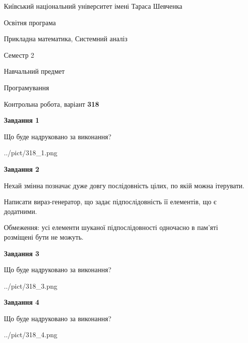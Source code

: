 \documentclass[12pt, ukrainian]{article}
\begin{document}
{{\begin {small}\par
{ \center  Київський національний університет імені Тараса Шевченка \par}
{\parbox {5 cm}{Освітня програма \hfill}{\parbox {8 cm}{Прикладна математика, Системний аналіз \hfill}}\parbox {5 cm}{\hfill Семестр 2}}\par
{\parbox {5 cm} {Навчальний предмет \hfill}\parbox {7 cm}{Програмування \hfill}\parbox {6cm}{\hfill}\par}\vspace{-7pt} \end{small}}{\center Контрольна робота, варіант  \No \textbf
{ 318 }\par}}
{
\begin {large}
{\begin {center}\textbf{Завдання 1}\end {center}}\par
Що буде надруковано за виконання?\par\par
\begin{center}
	{../pict/318_1.png}
\end{center}
\newpage

{\begin {center}\textbf{Завдання 2}\end {center}}\par
Нехай змінна  позначає дуже довгу послідовність цілих, по якій можна ітерувати.

Написати вираз-генератор, що задає підпослідовність її елементів, що є додатни\-ми.

Обмеження: усі елементи шуканої підпослідовності одночасно в пам'яті розміщені бути не можуть.\par
\newpage

{\begin {center}\textbf{Завдання 3}\end {center}}\par
Що буде надруковано за виконання?\par
\begin{center}
	{../pict/318_3.png}
\end{center}
\newpage

{\begin {center}\textbf{Завдання 4}\end {center}}\par
Що буде надруковано за виконання?\par
\begin{center}
	{../pict/318_4.png}
\end{center}
\newpage


\end{large}}
\end{document}
